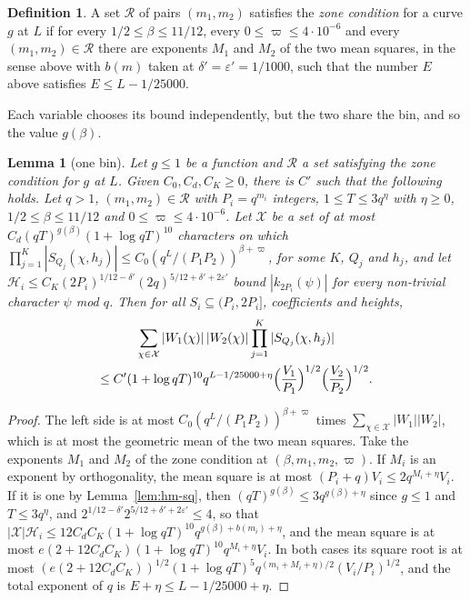 \documentclass[11pt]{article}
\newtheorem{lemma}[theorem]{Lemma}
\theoremstyle{definition}
\newtheorem{definition}[theorem]{Definition}
\begin{document}
\begin{definition}\label{def:zone}
A set $\mathcal R$ of pairs $(m_1, m_2)$ satisfies the \emph{zone condition} for a curve $g$ at $L$ if for every $1/2
\le \beta \le 11/12$, every $0 \le \varpi \le 4 \cdot 10^{-6}$ and every $(m_1, m_2) \in \mathcal R$ there are
exponents $M_1$ and $M_2$ of the two mean squares, in the sense above with $b(m)$ taken at $\delta' = \varepsilon' =
1/1000$, such that the number $E$ above satisfies $E \le L - 1/25000$.
\end{definition}

Each variable chooses its bound independently, but the two share the bin, and so the value $g(\beta)$.

\begin{lemma}[one bin]\label{lem:bin}
Let $g \le 1$ be a function and $\mathcal R$ a set satisfying the zone condition for $g$ at $L$. Given $C_0, C_d, C_K
\ge 0$, there is $C'$ such that the following holds. Let $q > 1$, $(m_1, m_2) \in \mathcal R$ with $P_i = q^{m_i}$
integers, $1 \le T \le 3q^\eta$ with $\eta \ge 0$, $1/2 \le \beta \le 11/12$ and $0 \le \varpi \le 4 \cdot 10^{-6}$.
Let $\mathcal X$ be a set of at most $C_d (qT)^{g(\beta)} (1 + \log qT)^{10}$ characters on which $\prod_{j=1}^K
|S_{Q_j}(\chi, h_j)| \le C_0 (q^L/(P_1P_2))^{\beta + \varpi}$, for some $K$, $Q_j$ and $h_j$, and let $\mathcal H_i \le
C_K (2P_i)^{1/12 - \delta'} (2q)^{5/12 + \delta' + 2\varepsilon'}$ bound $|k_{2P_i}(\psi)|$ for every non-trivial
character $\psi$ mod $q$. Then for all $S_i \subseteq (P_i, 2P_i]$, coefficients and heights,
\begin{multline*}
  \sum_{\chi \in \mathcal X} |W_1(\chi)|\, |W_2(\chi)| \prod_{j=1}^K |S_{Q_j}(\chi, h_j)| \\
  \le C' (1 + \log qT)^{10} q^{L - 1/25000 + \eta} \Bigl(\frac{V_1}{P_1}\Bigr)^{1/2} \Bigl(\frac{V_2}{P_2}\Bigr)^{1/2}.
\end{multline*}
\end{lemma}

\begin{proof}
The left side is at most $C_0 (q^L/(P_1P_2))^{\beta + \varpi}$ times $\sum_{\chi \in \mathcal X} |W_1||W_2|$, which is
at most the geometric mean of the two mean squares. Take the exponents $M_1$ and $M_2$ of the zone condition at
$(\beta, m_1, m_2, \varpi)$. If $M_i$ is an exponent by orthogonality, the mean square is at most $(P_i + q)V_i \le 2
q^{M_i + \eta} V_i$. If it is one by Lemma~\ref{lem:hm-sq}, then $(qT)^{g(\beta)} \le 3 q^{g(\beta) + \eta}$ since $g
\le 1$ and $T \le 3q^\eta$, and $2^{1/12 - \delta'} 2^{5/12 + \delta' + 2\varepsilon'} \le 4$, so that $|\mathcal
X|\mathcal H_i \le 12 C_d C_K (1 + \log qT)^{10} q^{g(\beta) + b(m_i) + \eta}$, and the mean square is at most $e(2 + 12
C_d C_K)(1 + \log qT)^{10} q^{M_i + \eta} V_i$. In both cases its square root is at most $(e(2 + 12C_dC_K))^{1/2}(1 +
\log qT)^5 q^{(m_i + M_i + \eta)/2} (V_i/P_i)^{1/2}$, and the total exponent of $q$ is $E + \eta \le L - 1/25000 +
\eta$.
\end{proof}
\end{document}
